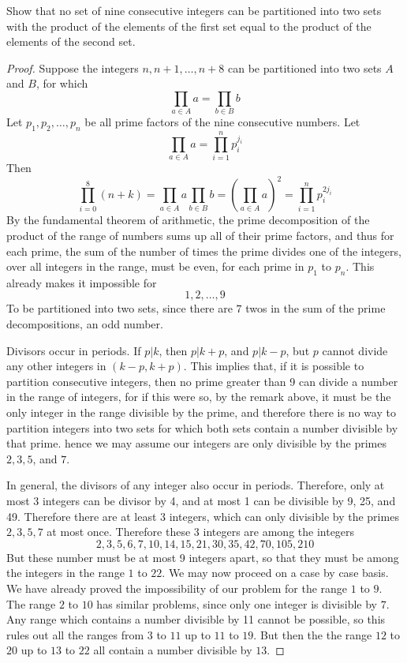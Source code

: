 \begin{exercise}
    Show that no set of nine consecutive integers can be partitioned into two sets with the product of the elements of the first set equal to the product of the elements of the second set.
\end{exercise}
\begin{proof}
    Suppose the integers $n, n+1, \dots, n+8$ can be partitioned into two sets $A$ and $B$, for which
    \[ \prod_{a \in A} a = \prod_{b \in B} b \]
    Let $p_1, p_2, \dots, p_n$ be all prime factors of the nine consecutive numbers. Let
    \[ \prod_{a \in A} a = \prod_{i = 1}^n p_i^{j_i} \]
    Then
    \[ \prod_{i = 0}^8 (n + k) = \prod_{a \in A} a \prod_{b \in B} b = (\prod_{a \in A} a)^2 = \prod_{i = 1}^n p_i^{2j_i}  \]
    By the fundamental theorem of arithmetic, the prime decomposition of the product of the range of numbers sums up all of their prime factors, and thus for each prime, the sum of the number of times the prime divides one of the integers, over all integers in the range, must be even, for each prime in $p_1$ to $p_n$. This already makes it impossible for
    \[ 1,2, \dots, 9 \]
    To be partitioned into two sets, since there are $7$ twos in the sum of the prime decompositions, an odd number.

    Divisors occur in periods. If $p | k$, then $p | k + p$, and $p | k - p$, but $p$ cannot divide any other integers in $(k-p,k+p)$. This implies that, if it is possible to partition consecutive integers, then no prime greater than 9 can divide a number in the range of integers, for if this were so, by the remark above, it must be the only integer in the range divisible by the prime, and therefore there is no way to partition integers into two sets for which both sets contain a number divisible by that prime. hence we may assume our integers are only divisible by the primes $2,3,5$, and $7$.

    In general, the divisors of any integer also occur in periods. Therefore, only at most 3 integers can be divisor by 4, and at most 1 can be divisible by 9, 25, and 49. Therefore there are at least 3 integers, which can only divisible by the primes $2,3,5,7$ at most once. Therefore these 3 integers are among the integers
    \[ 2,3,5,6,7,10,14,15,21,30,35,42,70,105,210 \]
    But these number must be at most 9 integers apart, so that they must be among the integers in the range $1$ to $22$. We may now proceed on a case by case basis. We have already proved the impossibility of our problem for the range $1$ to $9$. The range $2$ to $10$ has similar problems, since only one integer is divisible by $7$. Any range which contains a number divisible by 11 cannot be possible, so this rules out all the ranges from $3$ to $11$ up to $11$ to $19$. But then the the range $12$ to $20$ up to $13$ to $22$ all contain a number divisible by $13$.
\end{proof}

